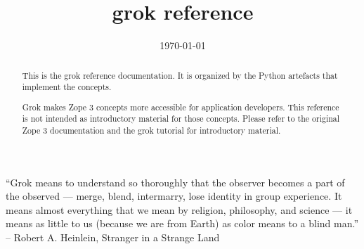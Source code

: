\documentclass{manual}
\title{grok reference}
\date{\today}   %
\begin{document}
\maketitle

``Grok means to understand so thoroughly that the observer becomes a part of the
observed --- merge, blend, intermarry, lose identity in group experience.
It means almost everything that we mean by religion, philosophy, and
science --- it means as little to us (because we are from Earth) as color
means to a blind man.'' -- Robert A. Heinlein, Stranger in a Strange Land

\begin{abstract}
This is the grok reference documentation. It is organized by the Python
artefacts that implement the concepts.

Grok makes Zope 3 concepts more accessible for application developers. This
reference is
not intended as introductory material for those concepts. Please refer to the 
original Zope 3 documentation and the grok tutorial for introductory material.
\end{abstract}


\tableofcontents












\end{document}
